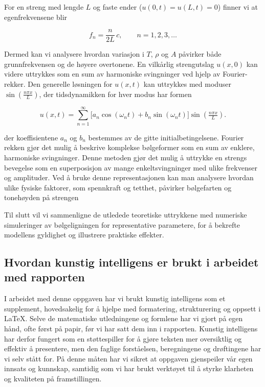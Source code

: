 For en streng med lengde $L$ og faste ender ($u(0,t)=u(L,t)=0$) finner vi at egenfrekvensene blir

\begin{equation*}
  f_n = \frac{n}{2L}\,c, \qquad n=1,2,3,\dots
\end{equation*}

Dermed kan vi analysere hvordan variasjon i $T$, $\rho$ og $A$ påvirker både grunnfrekvensen og de høyere overtonene.
En vilkårlig strengutslag $u(x,0)$ kan videre uttrykkes som en sum av harmoniske svingninger ved hjelp av Fourier-rekker.
Den generelle løsningen for $u(x,t)$ kan uttrykkes med moduser 
$\sin\!\left(\tfrac{n\pi x}{L}\right)$, der tidsdynamikken for hver modus har formen 

\begin{equation*}
    u(x,t) = \sum_{n=1}^{\infty} \bigl[a_n \cos(\omega_n t) + b_n \sin(\omega_n t)\bigr] 
    \sin\!\left(\tfrac{n\pi x}{L}\right).
\end{equation*}

der koeffisientene $a_n$ og $b_n$ bestemmes av de gitte initialbetingelsene.
Fourier rekken gjør det mulig å beskrive komplekse bølgeformer som en sum av enklere, harmoniske svingninger.  
Denne metoden gjør det mulig å uttrykke en strengs bevegelse som en superposisjon av mange enkeltsvingninger med ulike frekvenser og amplituder.  
Ved å bruke denne representasjonen kan man analysere hvordan ulike fysiske faktorer, som spennkraft og tetthet, påvirker bølgefarten og tonehøyden på strengen \parencite{libretextsWave}



Til slutt vil vi sammenligne de utledede teoretiske uttrykkene med numeriske simuleringer 
av bølgeligningen for representative parametere, for å bekrefte modellens gyldighet og illustrere praktiske effekter.

\subsection{Hvordan kunstig intelligens er brukt i arbeidet med rapporten}
I arbeidet med denne oppgaven har vi brukt kunstig intelligens som et supplement, hovedsakelig for å hjelpe med formatering, strukturering og oppsett i LaTeX. 
Selve de matematiske utledningene og formlene har vi gjort på egen hånd, ofte først på papir, før vi har satt dem inn i rapporten. 
Kunstig intelligens har derfor fungert som en støttespiller for å gjøre teksten mer oversiktlig og effektiv å presentere, men den faglige forståelsen, beregningene og drøftingene har vi selv stått for. 
På denne måten har vi sikret at oppgaven gjenspeiler vår egen innsats og kunnskap, samtidig som vi har brukt verktøyet til å styrke klarheten og kvaliteten på framstillingen.